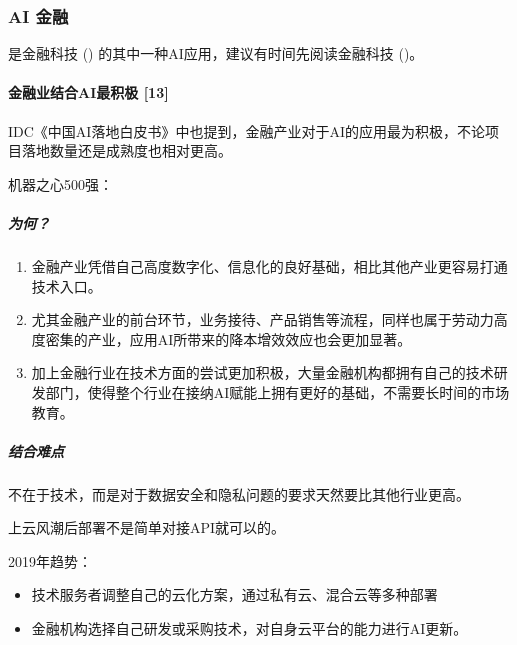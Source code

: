 \documentclass[letterpaper,11pt,english]{sphinxmanual}
\begin{document}
\subsubsection{AI 金融}
\label{\detokenize{chapter_project/AI_Finance:ai}}\label{\detokenize{chapter_project/AI_Finance::doc}}
是金融科技 {\hyperref[\detokenize{chapter_AI+Finance/FinTech:fintech}]{}} () 的其中一种AI应用，建议有时间先阅读金融科技
{\hyperref[\detokenize{chapter_AI+Finance/FinTech:fintech}]{}} ()。


\paragraph{金融业结合AI最积极 {[}13{]}}
\label{\detokenize{chapter_project/AI_Finance:ai-13}}
IDC《中国AI落地白皮书》中也提到，金融产业对于AI的应用最为积极，不论项目落地数量还是成熟度也相对更高。

机器之心500强：


\subparagraph{为何？}
\label{\detokenize{chapter_project/AI_Finance:id1}}\begin{enumerate}
%
\item {} 
金融产业凭借自己高度数字化、信息化的良好基础，相比其他产业更容易打通技术入口。

\item {} 
尤其金融产业的前台环节，业务接待、产品销售等流程，同样也属于劳动力高度密集的产业，应用AI所带来的降本增效效应也会更加显著。

\item {} 
加上金融行业在技术方面的尝试更加积极，大量金融机构都拥有自己的技术研发部门，使得整个行业在接纳AI赋能上拥有更好的基础，不需要长时间的市场教育。

\end{enumerate}


\subparagraph{结合难点}
\label{\detokenize{chapter_project/AI_Finance:id2}}
不在于技术，而是对于数据安全和隐私问题的要求天然要比其他行业更高。

上云风潮后部署不是简单对接API就可以的。

2019年趋势：
\begin{itemize}
\item {} 
技术服务者调整自己的云化方案，通过私有云、混合云等多种部署

\item {} 
金融机构选择自己研发或采购技术，对自身云平台的能力进行AI更新。

\end{itemize}
\end{document}
